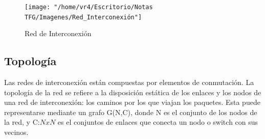 \begin{figure}[H]
	\centering
	\texttt{[image: "/home/vr4/Escritorio/Notas TFG/Imagenes/Red\_Interconexión"]}
	\caption{Red de Interconexión}
	\label{fig:redinterconexion}
\end{figure}

\subsection{Topología}\label{topology}
Las redes de interconexión están compuestas por elementos de conmutación. La topología de la red se refiere a la disposición estática de los enlaces y los nodos de una red de interconexión: los caminos por los que viajan los paquetes. Esta puede representarse mediante un grafo G(N,C), donde N es el conjunto de los nodos de la red, y C:$NxN$ es el conjuntos de enlaces que conecta un nodo o switch con sus vecinos.\\

